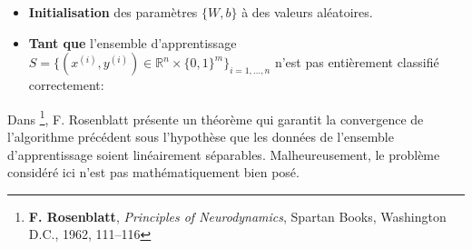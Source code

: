\begin{itemize}
\item \textbf{Initialisation} des paramètres $\lbrace W,b\rbrace$ à des valeurs aléatoires.
\item \textbf{Tant que} l'ensemble d'apprentissage $S=\lbrace(x^{(i)},y^{(i)})\in\mathbb{R}^{n}\times\lbrace 0,1\rbrace^{m}\rbrace_{i=1,\dots ,n}$ n'est pas entièrement classifié correctement:
\end{itemize}

Dans \cite{percep_converge}\footnote{\textbf{F. Rosenblatt}, \textit{Principles
of Neurodynamics}, Spartan Books, Washington D.C., 1962, 111–116}, F.
Rosenblatt présente un théorème qui garantit la convergence de l'algorithme
précédent sous l'hypothèse que les données de l'ensemble d'apprentissage soient
linéairement séparables. Malheureusement, le problème considéré ici n'est pas
mathématiquement bien posé.

